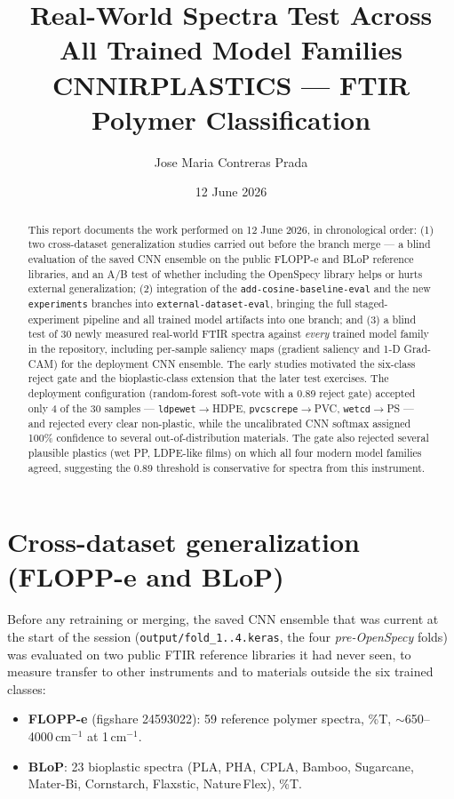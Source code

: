 \documentclass[11pt,a4paper]{article}
\title{\textbf{Real-World Spectra Test Across All Trained Model Families}\\
\large CNNIRPLASTICS --- FTIR Polymer Classification}
\author{Jose Maria Contreras Prada}
\date{12 June 2026}
\begin{document}
\maketitle

\begin{abstract}
This report documents the work performed on 12 June 2026, in chronological
order: (1) two cross-dataset generalization studies carried out before the
branch merge --- a blind evaluation of the saved CNN ensemble on the public
FLOPP-e and BLoP reference libraries, and an A/B test of whether including the
OpenSpecy library helps or hurts external generalization; (2) integration of the
\texttt{add-cosine-baseline-eval} and the new \texttt{experiments} branches into
\texttt{external-dataset-eval}, bringing the full staged-experiment pipeline and
all trained model artifacts into one branch; and (3) a blind test of 30 newly
measured real-world FTIR spectra against \emph{every} trained model family in
the repository, including per-sample saliency maps (gradient saliency and 1-D
Grad-CAM) for the deployment CNN ensemble. The early studies motivated the
six-class reject gate and the bioplastic-class extension that the later test
exercises. The deployment configuration
(random-forest soft-vote with a 0.89 reject gate) accepted only 4 of the 30
samples --- \texttt{ldpewet}$\to$HDPE, \texttt{pvcscrepe}$\to$PVC,
\texttt{wetcd}$\to$PS --- and rejected every clear non-plastic, while the
uncalibrated CNN softmax assigned 100\% confidence to several out-of-distribution
materials. The gate also rejected several plausible plastics (wet PP, LDPE-like
films) on which all four modern model families agreed, suggesting the 0.89
threshold is conservative for spectra from this instrument.
\end{abstract}

\section{Cross-dataset generalization (FLOPP-e and BLoP)}

Before any retraining or merging, the saved CNN ensemble that was current at the
start of the session (\texttt{output/fold\_1..4.keras}, the four
\emph{pre-OpenSpecy} folds) was evaluated on two public FTIR reference libraries
it had never seen, to measure transfer to other instruments and to materials
outside the six trained classes:

\begin{itemize}
  \item \textbf{FLOPP-e} (figshare 24593022): 59 reference polymer spectra, \%T,
        $\sim$650--4000\,cm$^{-1}$ at 1\,cm$^{-1}$.
  \item \textbf{BLoP}: 23 bioplastic spectra (PLA, PHA, CPLA, Bamboo, Sugarcane,
        Mater-Bi, Cornstarch, Flaxstic, Nature\,Flex), \%T.
\end{itemize}
\end{document}
